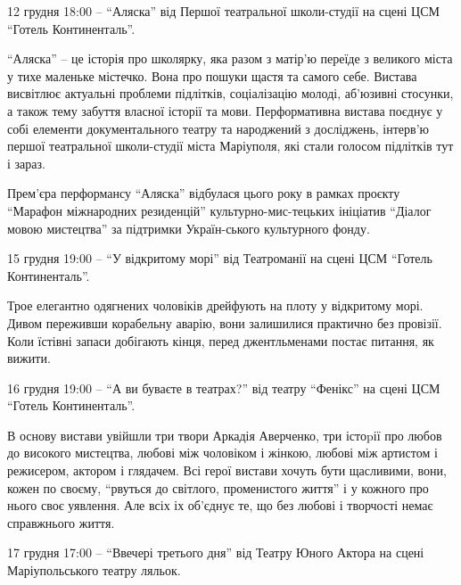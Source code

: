 
12 грудня 18:00 – \enquote{Аляска} від Першої театральної школи-студії на сцені
ЦСМ \enquote{Готель Континенталь}.

\enquote{Аляска} – це історія про школярку, яка разом з матір'ю переїде з
великого міста у тихе маленьке містечко. Вона про пошуки щастя та самого себе.
Вистава висвітлює актуальні проблеми підлітків, соціалізацію молоді, аб'юзивні
стосунки, а також тему забуття власної історії та мови. Перформативна вистава
поєднує у собі елементи документального театру та народжений з досліджень,
інтерв'ю першої театральної школи-студії міста Маріуполя, які стали голосом
підлітків тут і зараз.

Прем'єра перформансу \enquote{Аляска} відбулася цього року в рамках проєкту
\enquote{Марафон міжнародних резиденцій} культурно-мис\hyp{}тецьких ініціатив
\enquote{Діалог мовою мистецтва} за підтримки Україн\hyp{}ського культурного фонду.


15 грудня 19:00 – \enquote{У відкритому морі} від Театроманії на сцені ЦСМ \enquote{Готель Континенталь}.

Трое елегантно одягнених чоловіків дрейфують на плоту у відкритому морі. Дивом
переживши корабельну аварію, вони залишилися практично без провізії. Коли
їстівні запаси добігають кінця, перед джентльменами постає питання, як вижити.


16 грудня 19:00 – \enquote{А ви буваєте в театрах?} від театру \enquote{Фенікс} на сцені ЦСМ \enquote{Готель Континенталь}.

В основу вистави увійшли три твори Аркадія Аверченко, три істоpії про любов до
високого мистецтва, любові між чоловіком і жінкою, любові між артистом і
режисером, актором і глядачем. Всі герої вистави хочуть бути щасливими, вони,
кожен по своєму, \enquote{рвуться до світлого, променистого життя} і у кожного про
нього своє уявлення. Але всіх іх об'єднує те, що без любові і творчості немає
справжнього життя.


17 грудня 17:00 – \enquote{Ввечері третього дня} від Театру Юного Актора на
сцені Маріупольського театру ляльок.

